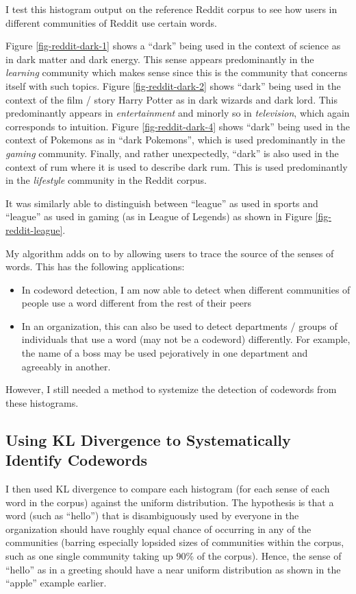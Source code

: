 I test this histogram output on the reference Reddit corpus to see how users in different communities of Reddit use certain words.

Figure \ref{fig-reddit-dark-1} shows a ``dark'' being used in the context of science as in dark matter and dark energy. This sense appears predominantly in the \emph{learning} community which makes sense since this is the community that concerns itself with such topics. Figure \ref{fig-reddit-dark-2} shows ``dark'' being used in the context of the film / story Harry Potter as in dark wizards and dark lord. This predominantly appears in \emph{entertainment} and minorly so in \emph{television}, which again corresponds to intuition. Figure \ref{fig-reddit-dark-4} shows ``dark'' being used in the context of Pokemons as in ``dark Pokemons'', which is used predominantly in the \emph{gaming} community. Finally, and rather unexpectedly, ``dark'' is also used in the context of rum where it is used to describe dark rum. This is used predominantly in the \emph{lifestyle} community in the Reddit corpus.

It was similarly able to distinguish between ``league'' as used in sports and ``league'' as used in gaming (as in League of Legends) as shown in Figure \ref{fig-reddit-league}.

My algorithm adds on to \cite{neelakantan2015efficient} by allowing users to trace the source of the senses of words. This has the following applications:

\begin{itemize}
\item In codeword detection, I am now able to detect when different communities of people use a word different from the rest of their peers
\item In an organization, this can also be used to detect departments / groups of individuals that use a word (may not be a codeword) differently. For example, the name of a boss may be used pejoratively in one department and agreeably in another.
\end{itemize}

However, I still needed a method to systemize the detection of codewords from these histograms.

\subsection{Using KL Divergence to Systematically Identify Codewords}

I then used KL divergence to compare each histogram (for each sense of each word in the corpus) against the uniform distribution. The hypothesis is that a word (such as ``hello'') that is disambiguously used by everyone in the organization should have roughly equal chance of occurring in any of the communities (barring especially lopsided sizes of communities within the corpus, such as one single community taking up 90\% of the corpus). Hence, the sense of ``hello'' as in a greeting should have a near uniform distribution as shown in the ``apple'' example earlier.

